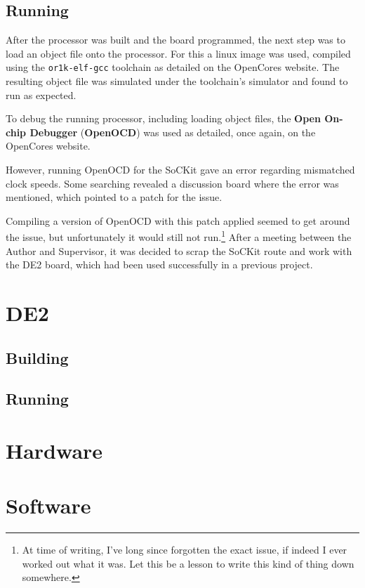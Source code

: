 \subsection{Running}
After the processor was built and the board programmed, the next step was to load an object file onto the processor. For this a linux image was used, compiled using the \verb|or1k-elf-gcc| toolchain as detailed on the OpenCores website\cite{or1k-linux}. The resulting object file was simulated under the toolchain's simulator and found to run as expected.

To debug the running processor, including loading object files, the \textbf{Open On-chip Debugger} (\textbf{OpenOCD}) was used as detailed, once again, on the OpenCores website\cite{or1k-openocd}.

However, running OpenOCD for the SoCKit gave an error regarding mismatched clock speeds. Some searching revealed a discussion board\cite{openocd-sockit} where the error was mentioned, which pointed to a patch for the issue\cite{openocd-fix}.

Compiling a version of OpenOCD with this patch applied seemed to get around the issue, but unfortunately it would still not run.\footnote{At time of writing, I've long since forgotten the exact issue, if indeed I ever worked out what it was. Let this be a lesson to write this kind of thing down somewhere.} After a meeting between the Author and Supervisor, it was decided to scrap the SoCKit route and work with the DE2 board, which had been used successfully in a previous project.

\section{DE2}

\subsection{Building}

\subsection{Running}


\section{Hardware}
\section{Software}